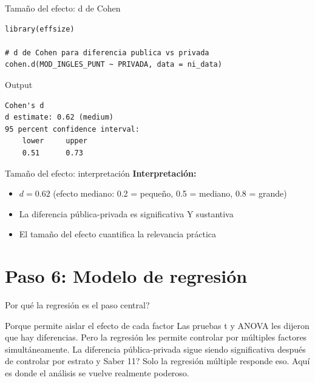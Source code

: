 \documentclass[aspectratio=169, 11pt]{beamer}
\begin{document}
\begin{frame}[fragile]{Tamaño del efecto: d de Cohen}
\begin{lstlisting}
library(effsize)

# d de Cohen para diferencia publica vs privada
cohen.d(MOD_INGLES_PUNT ~ PRIVADA, data = ni_data)
\end{lstlisting}

\vspace{0.2cm}
\begin{exampleblock}{Output}
\small
\begin{verbatim}
Cohen's d
d estimate: 0.62 (medium)
95 percent confidence interval:
    lower     upper
    0.51      0.73
\end{verbatim}
\end{exampleblock}
\end{frame}

\begin{frame}{Tamaño del efecto: interpretación}
\textbf{Interpretación:}
\begin{itemize}
\item $d = 0.62$ (efecto mediano: 0.2 = pequeño, 0.5 = mediano, 0.8 = grande)
\item La diferencia pública-privada es significativa Y sustantiva
\item El tamaño del efecto cuantifica la relevancia práctica
\end{itemize}
\end{frame}

\section{Paso 6: Modelo de regresión}

\begin{frame}{\textquestiondown{}Por qu\'e la regresi\'on es el paso central?}
\begin{exampleblock}{Porque permite aislar el efecto de cada factor}
\small
Las pruebas t y ANOVA les dijeron que hay diferencias. Pero la regresi\'on les permite controlar por m\'ultiples factores simult\'aneamente. \textquestiondown{}La diferencia p\'ublica-privada sigue siendo significativa despu\'es de controlar por estrato y Saber 11? Solo la regresi\'on m\'ultiple responde eso. Aqu\'i es donde el an\'alisis se vuelve realmente poderoso.
\end{exampleblock}
\end{frame}
\end{document}
